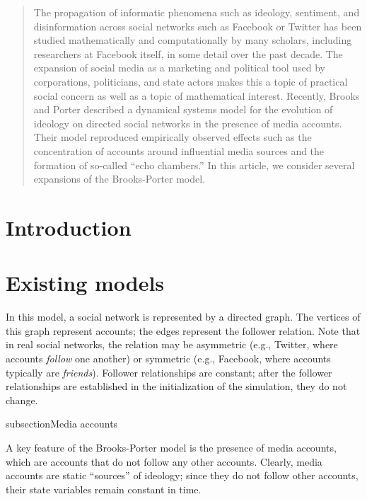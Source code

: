 \documentclass[10pt]{amsart}
\title{}
\author{Dylan Murphy}
\date{\today}
\begin{document}
\maketitle

\begin{abstract}
The propagation of informatic phenomena such as ideology, sentiment, and disinformation across social networks such as Facebook or Twitter has been studied mathematically and computationally by many scholars, including researchers at Facebook itself, in some detail over the past decade.
The expansion of social media as a marketing and political tool used by corporations, politicians, and state actors makes this a topic of practical social concern as well as a topic of mathematical interest.
Recently, Brooks and Porter\cite{HZBMAP2020} described a dynamical systems model for the evolution of ideology on directed social networks in the presence of media accounts.
Their model reproduced empirically observed effects such as the concentration of accounts around influential media sources and the formation of so-called ``echo chambers.''
In this article, we consider several expansions of the Brooks-Porter model.
\end{abstract}

\section{Introduction}



\section{Existing models}

In this model, a social network is represented by a directed graph.
The vertices of this graph represent accounts; the edges represent the follower relation.
Note that in real social networks, the relation may be asymmetric (e.g., Twitter, where accounts \emph{follow} one another) or symmetric (e.g., Facebook, where accounts typically are \emph{friends}).
Follower relationships are constant; after the follower relationships are established in the initialization of the simulation, they do not change.

subsection{Media accounts}

A key feature of the Brooks-Porter model is the presence of media accounts, which are accounts that do not follow any other accounts.
Clearly, media accounts are static ``sources'' of ideology; since they do not follow other accounts, their state variables remain constant in time.
\end{document}
